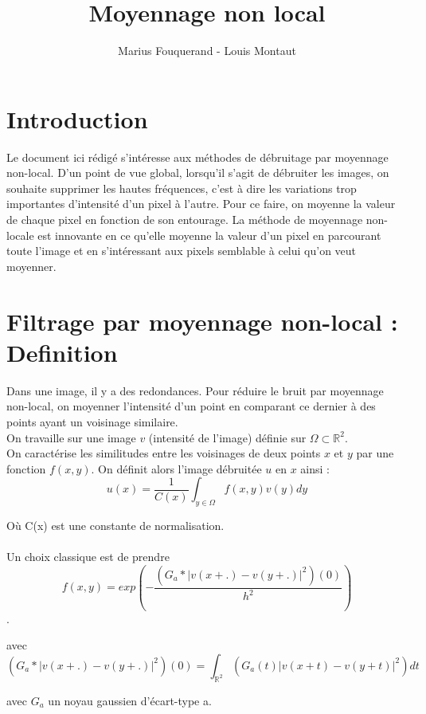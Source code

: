 \documentclass{article}
\title{Moyennage non local}
\author{Marius Fouquerand - Louis Montaut }
\date{}
\begin{document}
\maketitle

\section*{Introduction}
Le document ici rédigé s'intéresse aux méthodes de débruitage par moyennage non-local. D'un point de vue global, lorsqu'il s'agit de débruiter les images, on souhaite supprimer les hautes fréquences, c'est à dire les variations trop importantes d'intensité d'un pixel à l'autre. Pour ce faire, on moyenne la valeur de chaque pixel en fonction de son entourage. La méthode de moyennage non-locale est innovante en ce qu'elle moyenne la valeur d'un pixel en parcourant toute l'image et en s'intéressant aux pixels semblable à celui qu'on veut moyenner.

\section*{Filtrage par moyennage non-local : Definition} 

Dans une image, il y a des redondances. Pour réduire le bruit par moyennage non-local, on moyenner l'intensité  d'un point en comparant ce dernier à des points ayant un voisinage similaire. \\
On travaille sur une image $v$ (intensité de l'image) définie sur $\Omega \subset \mathbb{R}^2$. \\
On caractérise les similitudes entre les voisinages de deux points $x$ et $y$ par une fonction $f(x,y)$. On définit alors l'image débruitée $u$ en $x$ ainsi : $$u(x) = \frac{1}{C(x)} \int_{y \in \Omega}f(x,y) v(y) dy  $$ 

Où C(x) est une constante de normalisation.\\
\\
Un choix classique est de prendre $$f(x,y) = exp(- \frac{(G_a * |v(x+.)-v(y + .)|^2)(0)}{h^2}) $$. 

avec $$ (G_a * |v(x+.)-v(y + .)|^2)(0) = \int_{\mathbb{R}^2} (G_a(t) |v(x+t)-v(y+t)|^2) dt  $$ 

avec $G_a$ un noyau gaussien d'écart-type a. 
\end{document}

